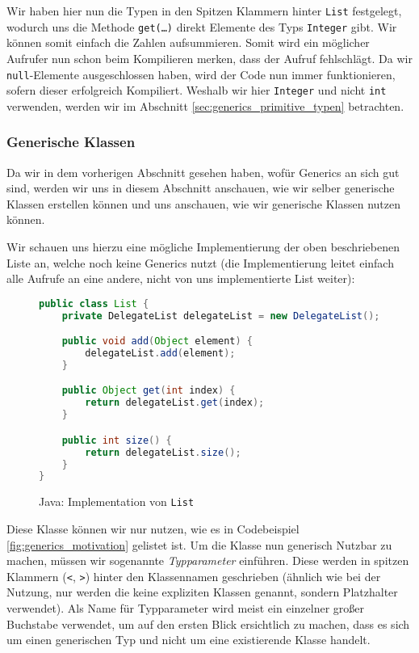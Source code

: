 		Wir haben hier nun die Typen in den Spitzen Klammern hinter \texttt{List} festgelegt, wodurch uns die Methode \texttt{get(\dots)} direkt Elemente des Typs \texttt{Integer} gibt. Wir können somit einfach die Zahlen aufsummieren. Somit wird ein möglicher Aufrufer nun schon beim Kompilieren merken, dass der Aufruf fehlschlägt. Da wir \texttt{null}-Elemente ausgeschlossen haben, wird der Code nun immer funktionieren, sofern dieser erfolgreich Kompiliert. Weshalb wir hier \texttt{Integer} und nicht \texttt{int} verwenden, werden wir im Abschnitt \ref{sec:generics_primitive_typen} betrachten.

	\subsubsection{Generische Klassen}
		Da wir in dem vorherigen Abschnitt gesehen haben, wofür Generics an sich gut sind, werden wir uns in diesem Abschnitt anschauen, wie wir selber generische Klassen erstellen können und uns anschauen, wie wir generische Klassen nutzen können.
		
		Wir schauen uns hierzu eine mögliche Implementierung der oben beschriebenen Liste an, welche noch keine Generics nutzt (die Implementierung leitet einfach alle Aufrufe an eine andere, nicht von uns implementierte List weiter):
		\begin{figure}[H]
			\centering
			\begin{lstlisting}[language = Java]
public class List {
	private DelegateList delegateList = new DelegateList();

	public void add(Object element) {
		delegateList.add(element);
	}

	public Object get(int index) {
		return delegateList.get(index);
	}

	public int size() {
		return delegateList.size();
	}
}
			\end{lstlisting}
			\caption{Java: Implementation von \texttt{List}}
		\end{figure}
		
		Diese Klasse können wir nur nutzen, wie es in Codebeispiel \ref{fig:generics_motivation} gelistet ist. Um die Klasse nun generisch Nutzbar zu machen, müssen wir sogenannte \textit{Typparameter} einführen. Diese werden in spitzen Klammern (\texttt{<}, \texttt{>}) hinter den Klassennamen geschrieben (ähnlich wie bei der Nutzung, nur werden die keine expliziten Klassen genannt, sondern Platzhalter verwendet). Als Name für Typparameter wird meist ein einzelner großer Buchstabe verwendet, um auf den ersten Blick ersichtlich zu machen, dass es sich um einen generischen Typ und nicht um eine existierende Klasse handelt.
		
